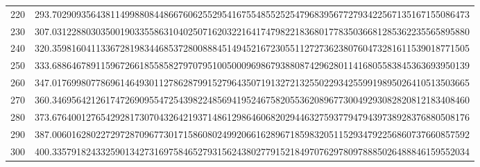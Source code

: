 \documentclass[final]{article}
\begin{document}
\begin{table}
\begin{center}
\begin{tabular}{|c|c|}
\\
220 &   293.70290935643811499880844866760625529541675548552525479683956772793422567135167155086473%
\\
230 &   307.03122880303500190335586310402507162032216417479822183680177835036681285362235565895880%
\\
240 &   320.35981604113367281983446853728008884514945216723055112727362380760473281611539018771505%
\\
250 &   333.68864678911596726618558582797079510050009698679388087429628011416805583845363693950139%
\\
260 &   347.01769980778696146493011278628799152796435071913272132550229342559919895026410513503665%
\\
270 &   360.34695642126174726909554725439822485694195246758205536208967730049293082820812183408460%
\\
280 &   373.67640012765429281730704326421937148612986460682029446327593779479439738928376880508176%
\\
290 &   387.00601628022729728709677301715860802499206616289671859832051152934792256860737660857592%
\\
300 &   400.33579182433259013427316975846527931562438027791521849707629780978885026488846159552034%
\\
\hline
\hline
\end{tabular}
\end{center}
\bigskip\bigskip
\end{table}
\end{document}
